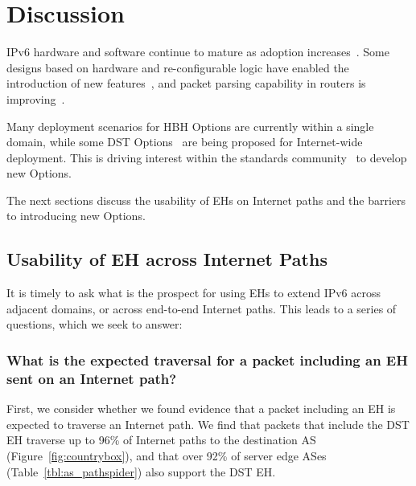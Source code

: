 \documentclass[conference]{IEEEtran}
\begin{document}

\section{Discussion} 
\label{sec:discussion}

IPv6 hardware and software continue to mature as adoption increases~\cite{v6adoption_ton}.
Some designs based on hardware and re-configurable logic have enabled the introduction of new features~\cite{cisco-silicon-one}, and packet parsing capability in routers is improving~\cite{metamorphosis, hauser2023}.

Many deployment scenarios for HBH Options are currently within a single domain, while some DST Options~\cite{ietf-ippm-ioam-ipv6-options-12} are being proposed for Internet-wide deployment.
This is driving interest within the standards community~\cite{ietf-6man-HBH-processing-06, ietf-v6ops-hbh-03, ietf-6man-eh-limits-02} to develop new Options.

The next sections discuss the usability of EHs on Internet paths and the barriers to introducing new Options.


\subsection{Usability of EH across Internet Paths}
  


It is timely to ask what is the prospect for using EHs to extend IPv6 across adjacent domains, or across end-to-end Internet paths. This leads to a series of questions, which we seek to answer: 
\subsubsection{What is the expected traversal for a packet including an EH sent on an Internet path?}
First, we consider whether we found evidence that a packet including an EH is expected to traverse an Internet path.
We find that packets that include the DST EH traverse up to 96\% of Internet paths to the destination AS (Figure~\ref{fig:countrybox}), and that over 92\% of server edge ASes (Table~\ref{tbl:as_pathspider}) also support the DST EH. 
\end{document}
